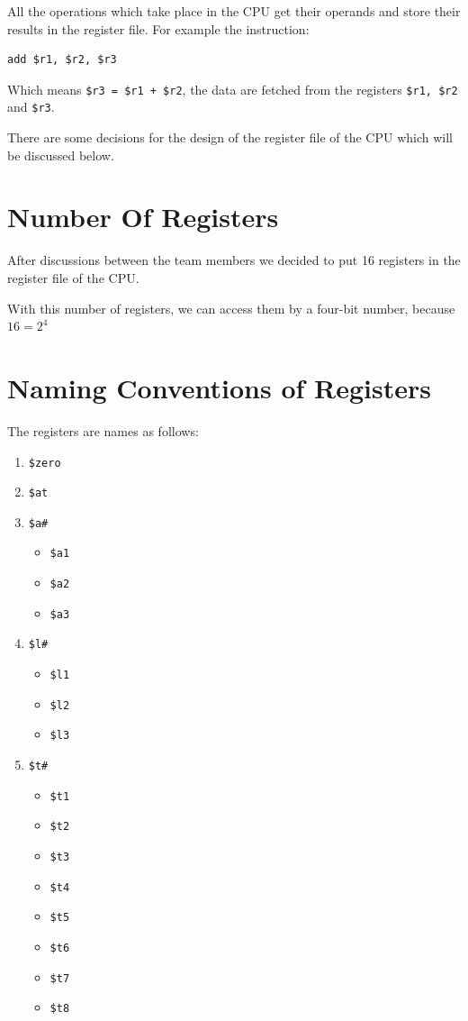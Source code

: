 \documentclass[12pt, dvipsnames, svgnames, x11names, oneside]{book}
\begin{document}
All the operations which take place in the CPU get their operands and store their results in the register file. For example the instruction:

\begin{lstlisting}
add $r1, $r2, $r3
\end{lstlisting}

\noindent Which means \texttt{\$r3 = \$r1 + \$r2}, the data are fetched from the registers \texttt{\$r1, \$r2} and \texttt{\$r3}.

There are some decisions for the design of the register file of the CPU which will be discussed below.

\section{Number Of Registers}\label{sec:num-of-regs}
After discussions between the team members we decided to put 16 registers in the register file of the CPU.

With this number of registers, we can access them by a four-bit number, because $16 = 2^4$

\section{Naming Conventions of Registers}\label{sec:name-of-regs}
The registers are names as follows:
\begin{enumerate}
\item \texttt{\$zero}
\item \texttt{\$at}
\item \texttt{\$a\#}
\begin{itemize}
\item \texttt{\$a1}
\item \texttt{\$a2}
\item \texttt{\$a3}
\end{itemize}
\item \texttt{\$l\#}
\begin{itemize}
\item \texttt{\$l1}
\item \texttt{\$l2}
\item \texttt{\$l3}
\end{itemize}
\item \texttt{\$t\#}
\begin{itemize}
	\item \texttt{\$t1}
	\item \texttt{\$t2}
	\item \texttt{\$t3}
	\item \texttt{\$t4}
	\item \texttt{\$t5}
	\item \texttt{\$t6}
	\item \texttt{\$t7}
	\item \texttt{\$t8}
\end{itemize}

\end{enumerate}
\end{document}
